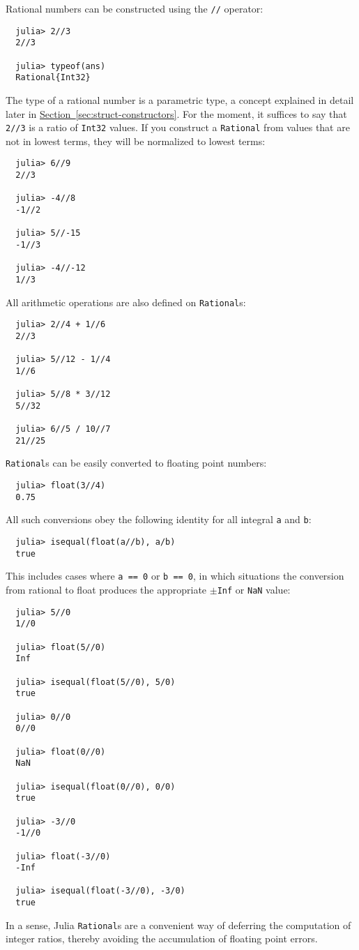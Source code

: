\documentclass{article}
\newcommand{\Section}[1]{\hyperref[sec:#1]{Section~\ref*{sec:#1}}}
\begin{document}
Rational numbers can be constructed using the \texttt{//} operator:
\begin{verbatim}
  julia> 2//3
  2//3

  julia> typeof(ans)
  Rational{Int32}
\end{verbatim}
The type of a rational number is a parametric type, a concept explained in detail later in \Section{struct-constructors}.
For the moment, it suffices to say that \verb|2//3| is a ratio of \verb|Int32| values.
If you construct a \verb|Rational| from values that are not in lowest terms, they will be normalized to lowest terms:
\begin{verbatim}
  julia> 6//9
  2//3

  julia> -4//8
  -1//2

  julia> 5//-15
  -1//3

  julia> -4//-12
  1//3
\end{verbatim}
All arithmetic operations are also defined on \verb|Rational|s:
\begin{verbatim}
  julia> 2//4 + 1//6
  2//3

  julia> 5//12 - 1//4
  1//6

  julia> 5//8 * 3//12
  5//32

  julia> 6//5 / 10//7
  21//25
\end{verbatim}
\verb|Rational|s can be easily converted to floating point numbers:
\begin{verbatim}
  julia> float(3//4)
  0.75
\end{verbatim}
All such conversions obey the following identity for all integral \verb|a| and \verb|b|:
\begin{verbatim}
  julia> isequal(float(a//b), a/b)
  true
\end{verbatim}
This includes cases where \verb|a == 0| or \verb|b == 0|, in which situations the conversion from rational to float produces the appropriate $\pm$\verb|Inf| or \verb|NaN| value:
\begin{verbatim}
  julia> 5//0
  1//0

  julia> float(5//0)
  Inf

  julia> isequal(float(5//0), 5/0)
  true

  julia> 0//0
  0//0

  julia> float(0//0)
  NaN

  julia> isequal(float(0//0), 0/0)
  true

  julia> -3//0
  -1//0

  julia> float(-3//0)
  -Inf

  julia> isequal(float(-3//0), -3/0)
  true
\end{verbatim}
In a sense, Julia \verb|Rational|s are a convenient way of deferring the computation of integer ratios, thereby avoiding the accumulation of floating point errors.
\end{document}
